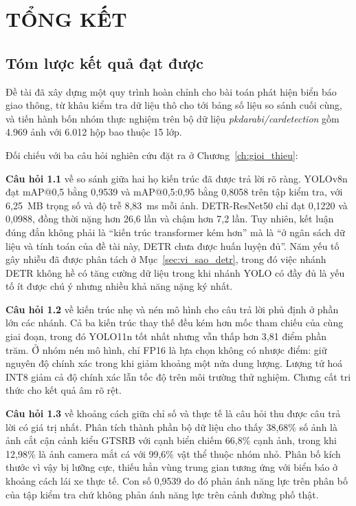 \chapter{TỔNG KẾT}
\label{ch:tong_ket}

\section{Tóm lược kết quả đạt được}

Đề tài đã xây dựng một quy trình hoàn chỉnh cho bài toán phát hiện biển báo giao thông, từ khâu
kiểm tra dữ liệu thô cho tới bảng số liệu so sánh cuối cùng, và tiến hành bốn nhóm thực nghiệm
trên bộ dữ liệu \textit{pkdarabi/cardetection} gồm 4.969 ảnh với 6.012 hộp bao thuộc 15 lớp.

Đối chiếu với ba câu hỏi nghiên cứu đặt ra ở Chương~\ref{ch:gioi_thieu}:

\textbf{Câu hỏi 1.1} về so sánh giữa hai họ kiến trúc đã được trả lời rõ ràng. YOLOv8n đạt mAP@0,5
bằng 0,9539 và mAP@0,5:0,95 bằng 0,8058 trên tập kiểm tra, với 6,25~MB trọng số và độ trễ 8,83~ms
mỗi ảnh. DETR-ResNet50 chỉ đạt 0,1220 và 0,0988, đồng thời nặng hơn 26,6 lần và chậm hơn 7,2 lần.
Tuy nhiên, kết luận đúng đắn không phải là ``kiến trúc transformer kém hơn'' mà là ``ở ngân sách
dữ liệu và tính toán của đề tài này, DETR chưa được huấn luyện đủ''. Năm yếu tố gây nhiễu đã được
phân tách ở Mục~\ref{sec:vi_sao_detr}, trong đó việc nhánh DETR không hề có tăng cường dữ liệu
trong khi nhánh YOLO có đầy đủ là yếu tố ít được chú ý nhưng nhiều khả năng nặng ký nhất.

\textbf{Câu hỏi 1.2} về kiến trúc nhẹ và nén mô hình cho câu trả lời phủ định ở phần lớn các nhánh.
Cả ba kiến trúc thay thế đều kém hơn mốc tham chiếu của cùng giai đoạn, trong đó YOLO11n tốt nhất
nhưng vẫn thấp hơn 3,81 điểm phần trăm. Ở nhóm nén mô hình, chỉ FP16 là lựa chọn không có nhược điểm: giữ nguyên độ
chính xác trong khi giảm khoảng một nửa dung lượng. Lượng tử hoá INT8 giảm cả độ chính xác lẫn tốc
độ trên môi trường thử nghiệm. Chưng cất tri thức cho kết quả âm rõ rệt.

\textbf{Câu hỏi 1.3} về khoảng cách giữa chỉ số và thực tế là câu hỏi thu được câu trả lời có giá
trị nhất. Phân tích thành phần bộ dữ liệu cho thấy 38,68\% số ảnh là ảnh cắt cận cảnh kiểu GTSRB
với cạnh biển chiếm 66,8\% cạnh ảnh, trong khi 12,98\% là ảnh camera mắt cá với 99,6\% vật thể
thuộc nhóm nhỏ. Phân bố kích thước vì vậy bị lưỡng cực, thiếu hẳn vùng trung gian tương ứng với
biển báo ở khoảng cách lái xe thực tế. Con số 0,9539 do đó phản ánh năng lực trên phân bố của tập
kiểm tra chứ không phản ánh năng lực trên cảnh đường phố thật.

